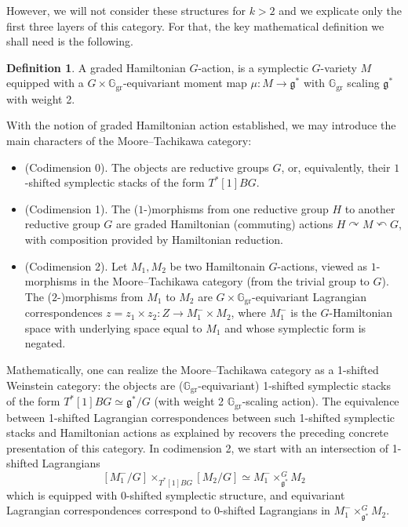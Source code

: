\documentclass[11pt, a4paper]{amsart}
\numberwithin{equation}{section}
\theoremstyle{definition}
\newtheorem{definition}[theorem]{Definition}
\theoremstyle{remark}
\newcommand{\Ggr}{\mathbb{G}_{\mathrm{gr}}}
\renewcommand{\to}{\longrightarrow}
\newcommand{\acts}{\curvearrowright}
\newcommand{\racts}{\curvearrowleft}
\begin{document}
However, we will not consider these structures for $k>2$ and we explicate only the first three layers of this category. For that, the key mathematical definition we shall need is the following. 
\begin{definition}
A graded Hamiltonian $G$-action, is a symplectic $G$-variety $M$ equipped with a $G \times \Ggr$-equivariant moment map $\mu: M \to \mathfrak{g}^*$ with $\Ggr$ scaling $\mathfrak{g}^*$ with weight 2. 
\end{definition}

With the notion of graded Hamiltonian action established, we may introduce the main characters of the Moore--Tachikawa category:
\begin{itemize}
    \item (Codimension 0). The objects are reductive groups $G$, or, equivalently, their $1$-shifted symplectic stacks of the form $T^*[1]BG$. 
    \item (Codimension 1). The ($1$-)morphisms from one reductive group $H$ to another reductive group $G$ are graded Hamiltonian (commuting) actions $H \acts M \racts G$, with composition provided by Hamiltonian reduction. 
    \item (Codimension 2). Let $M_1, M_2$ be two Hamiltonain $G$-actions, viewed as $1$-morphisms in the Moore--Tachikawa category (from the trivial group to $G$). The ($2$-)morphisms from $M_1$ to $M_2$ are $G \times \Ggr$-equivariant Lagrangian correspondences $z = z_1 \times z_2:Z \to M_1^- \times M_2$, where $M_1^-$ is the $G$-Hamiltonian space with underlying space equal to $M_1$ and whose symplectic form is negated. 
\end{itemize}


Mathematically, one can realize the Moore--Tachikawa category as a 1-shifted Weinstein category: the objects are ($\Ggr$-equivariant) 1-shifted symplectic stacks of the form $T^*[1]BG \simeq \mathfrak{g}^*/G$ (with weight 2 $\Ggr$-scaling action). The equivalence between 1-shifted Lagrangian correspondences between such 1-shifted symplectic stacks and Hamiltonian actions as explained by \cite{Safronov} recovers the preceding concrete presentation of this category. In codimension 2, we start with an intersection of 1-shifted Lagrangians 
$$[M_1^-/G] \times_{T^*[1]BG} [M_2/G] \simeq M_1^- \times_{\mathfrak{g}^*}^G M_2$$
which is equipped with 0-shifted symplectic structure, and equivariant Lagrangian correspondences correspond to 0-shifted Lagrangians in $M_1^- \times_{\mathfrak{g}^*}^G M_2$. 
\end{document}
